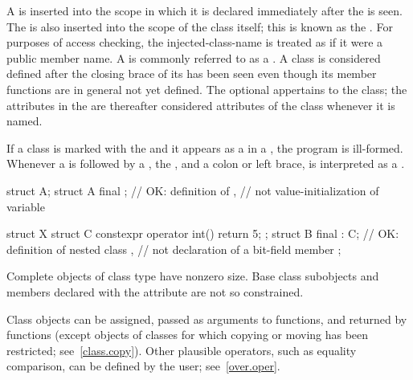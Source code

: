 \pnum
A  is inserted into the scope in which it is
declared immediately after the  is seen. The
 is also inserted into the scope of the class
itself; this is known as the .
For purposes of access checking, the injected-class-name is treated as
if it were a public member name.
A  is commonly referred to as a .
A class is considered defined after the closing brace of its
 has been seen even though its member
functions are in general not yet defined.
The optional  appertains to the class; the attributes in
the  are thereafter considered attributes of the class
whenever it is named.

\pnum
If a class is marked with the   and it appears
as a  in a ,
the program is ill-formed. Whenever a
 is followed by a , the
 , and a colon or left brace,  is
interpreted as a . \begin{example}
\begin{codeblock}
struct A;
struct A final {};      // OK: definition of ,
                        // not value-initialization of variable 

struct X {
 struct C { constexpr operator int() { return 5; } };
 struct B final : C{};  // OK: definition of nested class ,
                        // not declaration of a bit-field member 
};
\end{codeblock}
\end{example}

\pnum
\begin{note}
Complete objects of class type have nonzero size.
Base class subobjects and
members declared with the  attribute
are not so constrained.
\end{note}

\pnum
\begin{note}
Class objects can be assigned, passed as arguments to functions, and
returned by functions (except objects of classes for which copying or moving has
been restricted; see~\ref{class.copy}). Other plausible operators, such
as equality comparison, can be defined by the user; see~\ref{over.oper}.
\end{note}

